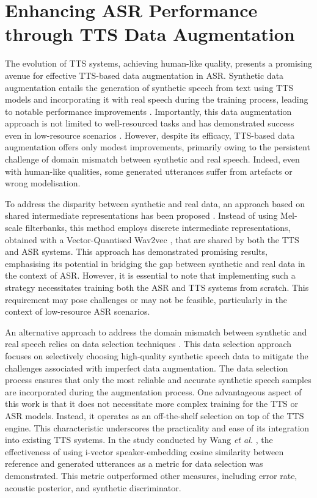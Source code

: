 \section{Enhancing ASR Performance through TTS Data Augmentation}
The evolution of \ac{TTS} systems, achieving human-like quality, presents a promising avenue for effective \ac{TTS}-based data augmentation in \ac{ASR}.
Synthetic data augmentation entails the generation of synthetic speech from text using \ac{TTS} models and incorporating it with real speech during the training process, leading to notable performance improvements \cite{laptev2020you}. Importantly, this data augmentation approach is not limited to well-resourced tasks and has demonstrated success even in low-resource scenarios \cite{casanova2022asr}. However, despite its efficacy, \ac{TTS}-based data augmentation offers only modest improvements, primarily owing to the persistent challenge of domain mismatch between synthetic and real speech. Indeed, even with human-like qualities, some generated utterances suffer from artefacts or wrong modelisation.

To address the disparity between synthetic and real data, an approach based on shared intermediate representations has been proposed \cite{9688218}. Instead of using Mel-scale filterbanks, this method employs discrete intermediate representations, obtained with a Vector-Quantised Wav2vec \cite{vqwav2vec}, that are shared by both the \ac{TTS} and \ac{ASR} systems. This approach has demonstrated promising results, emphasising its potential in bridging the gap between synthetic and real data in the context of \ac{ASR}. However, it is essential to note that implementing such a strategy necessitates training both the \ac{ASR} and \ac{TTS} systems from scratch. This requirement may pose challenges or may not be feasible, particularly in the context of low-resource \ac{ASR} scenarios.

An alternative approach to address the domain mismatch between synthetic and real speech relies on data selection techniques \cite{wang2021towards}. This data selection approach focuses on selectively choosing high-quality synthetic speech data to mitigate the challenges associated with imperfect data augmentation. The data selection process ensures that only the most reliable and accurate synthetic speech samples are incorporated during the augmentation process. One advantageous aspect of this work is that it does not necessitate more complex training for the \ac{TTS} or \ac{ASR} models. Instead, it operates as an off-the-shelf selection on top of the \ac{TTS} engine. This characteristic underscores the practicality and ease of its integration into existing \ac{TTS} systems.
In the study conducted by Wang \textit{et al.} \cite{wang2021towards}, the effectiveness of using i-vector speaker-embedding cosine similarity between reference and generated utterances as a metric for data selection was demonstrated. This metric outperformed other measures, including error rate, acoustic posterior, and synthetic discriminator.

